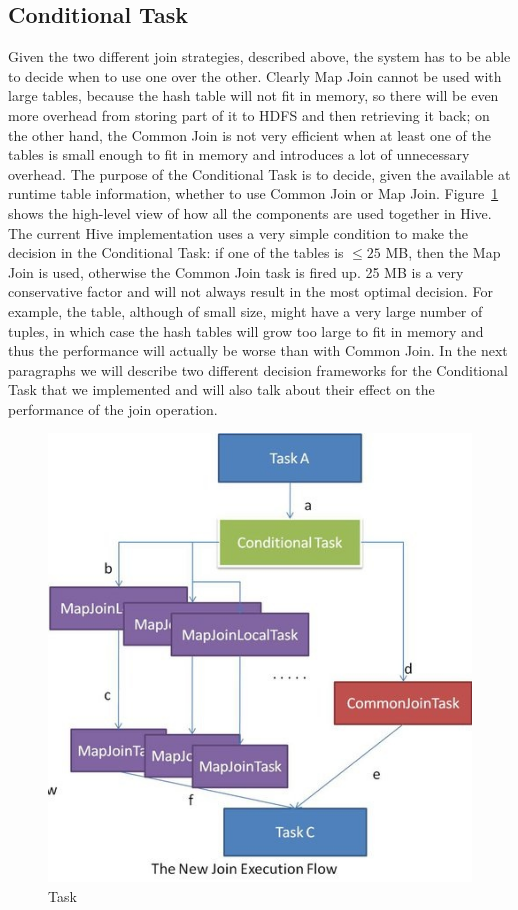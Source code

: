 \documentclass[11 pt ]{article}
\begin{document}
\subsection{Conditional Task}
Given the two different join strategies, described above, the system has to be able to decide when to use one over the other. Clearly Map Join cannot be used with large tables, because the hash table will not fit in memory, so there will be even more overhead from storing part of it to HDFS and then retrieving it back; on the other hand, the Common Join is not very efficient when at least one of the tables is small enough to fit in memory and introduces a lot of unnecessary overhead. The purpose of the Conditional Task is to decide, given the available at runtime table information, whether to use Common Join or Map Join. Figure~\ref{fig:conditional} shows the high-level view of how all the components are used together in Hive. The current Hive implementation uses a very simple condition to make the decision in the Conditional Task: if one of the tables is $\leq 25$ MB, then the Map Join is used, otherwise the Common Join task is fired up. 25 MB is a very conservative factor and will not always result in the most optimal decision. For example, the table, although of small size, might have a very large number of tuples, in which case the hash tables will grow too large to fit in memory and thus the performance will actually be worse than with Common Join. In the next paragraphs we will describe two different decision frameworks for the Conditional Task that we implemented and will also talk about their effect on the performance of the join operation.
\begin{figure}
	      \centering
                \includegraphics[scale=1]{condition.jpg}
              \caption{ Task \cite{facebook-join}}
              \label{fig:conditional}
\end{figure}
\end{document}
